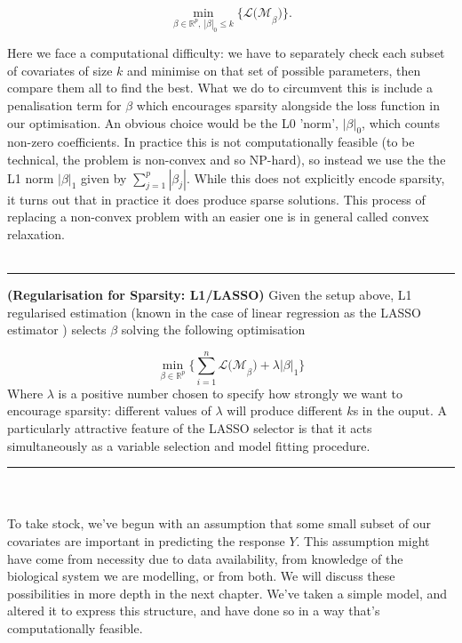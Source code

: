 \documentclass[thesis.tex]{subfiles}
\begin{document}
\begin{equation}
\min_{\beta \in \mathbb{R}^p, \ |\beta|_0 \leq k} \{ \mathcal{L(M}_\beta) \}.
\end{equation}

Here we face a computational difficulty: we have to separately check each subset of covariates of size $k$ and minimise on that set of possible parameters, then compare them all to find the best. What we do to circumvent this is include a penalisation term for $\beta$ which encourages sparsity alongside the loss function in our optimisation. An obvious choice would be the L0 'norm', $|\beta|_0$, which counts non-zero coefficients. In practice this is not computationally feasible (to be technical, the problem is non-convex and so NP-hard), so instead we use the the L1 norm $|\beta|_1$  given by $\sum_{j = 1}^{p} |\beta_j|$. While this does not explicitly encode sparsity, it turns out that in practice it does produce sparse solutions. This process of replacing a non-convex problem with an easier one is in general called convex relaxation. \\ ~ \\

\hrule
\begin{technique}{\textbf{(Regularisation for Sparsity: L1/LASSO)}} \label{sec:lasso}
Given the setup above, L1 regularised estimation (known in the case of linear regression as the LASSO estimator \citep{tibshirani_regression_1996}) selects $\beta$ solving the following optimisation

$$\min_{\beta \in \mathbb{R}^p} \{\sum\limits_{i = 1}^{n} \mathcal{L(M}_\beta) + \lambda |\beta|_1 \} $$
Where $\lambda$ is a positive number chosen to specify how strongly we want to encourage sparsity: different values of $\lambda$ will produce different $k$s in the ouput. A particularly attractive feature of the LASSO selector is that it acts simultaneously as a variable selection and model fitting procedure.
\end{technique}
\hrule ~ \\ ~ \\

To take stock, we've begun with an assumption that some small subset of our covariates are important in predicting the response $Y$. This assumption might have come from necessity due to data availability, from knowledge of the biological system we are modelling, or from both. We will discuss these possibilities in more depth in the next chapter. We've taken a simple model, and altered it to express this structure, and have done so in a way that's computationally feasible. 
\end{document}
